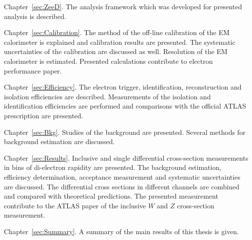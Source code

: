 \begin{description}
\item Chapter~\ref{sec:ZeeD}. The analysis framework which was developed for presented analysis is described.

\item Chapter~\ref{sec:Calibration}. The method of the off-line calibration of the EM calorimeter is explained and calibration results are presented. The systematic uncertainties of the calibration are discussed as well. Resolution of the EM calorimeter is estimated. Presented calculations contribute to electron performance paper.

\item Chapter~\ref{sec:Efficiency}. The electron trigger, identification, reconstruction and isolation efficiencies are described. Measurements of the isolation and identification efficiencies are performed and comparisons with the official ATLAS prescription are presented.

\item Chapter~\ref{sec:Bkg}. Studies of the background are presented. Several methods for background estimation are discussed.

\item Chapter~\ref{sec:Results}. Inclusive and single differential cross-section measurements in bins of di-electron rapidity are presented. The background estimation, efficiency determination, acceptance measurement and systematic uncertainties are discussed. The differential cross sections in different channels are combined and compared with theoretical predictions. The presented measurement contribute to the ATLAS paper of the inclusive $W$ and $Z$ cross-section measurement.

\item Chapter~\ref{sec:Summary}. A summary of the main results of this thesis is given.
\end{description}

